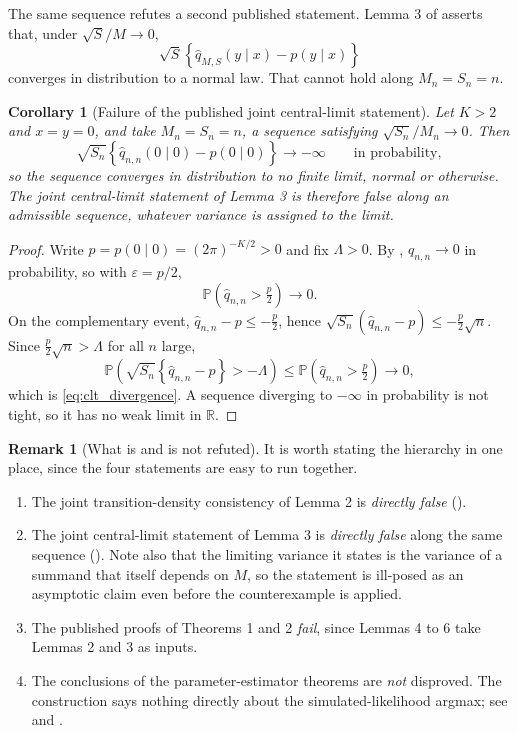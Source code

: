 \documentclass[11pt]{article}
\newtheorem{corollary}[corollary]{Corollary}
\theoremstyle{definition}
\newtheorem{remark}[remark]{Remark}
\newcommand{\R}{\mathbb{R}}
\newcommand{\Pp}{\mathbb{P}}
\begin{document}
The same sequence refutes a second published statement. Lemma 3 of \citet{BrandtSantaClara2002} asserts that, under $\sqrt S/M\to0$,
\[
\sqrt S\left\{\widehat q_{M,S}(y\mid x)-p(y\mid x)\right\}
\]
converges in distribution to a normal law. That cannot hold along $M_n=S_n=n$.

\begin{corollary}[Failure of the published joint central-limit statement]\label{cor:clt_failure}
Let $K>2$ and $x=y=0$, and take $M_n=S_n=n$, a sequence satisfying $\sqrt{S_n}/M_n\to0$. Then
\begin{equation}\label{eq:clt_divergence}
\sqrt{S_n}\left\{\widehat q_{n,n}(0\mid0)-p(0\mid0)\right\}\longrightarrow-\infty
\qquad\text{in probability},
\end{equation}
so the sequence converges in distribution to no finite limit, normal or otherwise. The joint central-limit statement of Lemma 3 is therefore false along an admissible sequence, whatever variance is assigned to the limit.
\end{corollary}

\begin{proof}
Write $p=p(0\mid0)=(2\pi)^{-K/2}>0$ and fix $\Lambda>0$. By , $\widehat q_{n,n}\to0$ in probability, so with $\varepsilon=p/2$,
\[
\Pp\left(\widehat q_{n,n}>\tfrac p2\right)\longrightarrow0 .
\]
On the complementary event, $\widehat q_{n,n}-p\le-\tfrac p2$, hence $\sqrt{S_n}(\widehat q_{n,n}-p)\le-\tfrac p2\sqrt n$. Since $\tfrac p2\sqrt n>\Lambda$ for all $n$ large,
\[
\Pp\left(\sqrt{S_n}\left\{\widehat q_{n,n}-p\right\}>-\Lambda\right)
\le\Pp\left(\widehat q_{n,n}>\tfrac p2\right)\longrightarrow0 ,
\]
which is \eqref{eq:clt_divergence}. A sequence diverging to $-\infty$ in probability is not tight, so it has no weak limit in $\R$.
\end{proof}

\begin{remark}[What is and is not refuted]\label{rem:hierarchy}
It is worth stating the hierarchy in one place, since the four statements are easy to run together.
\begin{enumerate}[label=(\roman*)]
\item The joint transition-density consistency of Lemma 2 is \emph{directly false} ().
\item The joint central-limit statement of Lemma 3 is \emph{directly false} along the same sequence (). Note also that the limiting variance it states is the variance of a summand that itself depends on $M$, so the statement is ill-posed as an asymptotic claim even before the counterexample is applied.
\item The published proofs of Theorems 1 and 2 \emph{fail}, since Lemmas 4 to 6 take Lemmas 2 and 3 as inputs.
\item The conclusions of the parameter-estimator theorems are \emph{not} disproved. The construction says nothing directly about the simulated-likelihood argmax; see  and .
\end{enumerate}
\end{remark}
\end{document}
